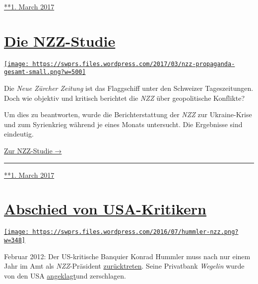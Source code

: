 \href{https://swprs.org/2017/03/01/nzz-new-american-century/}{**1. March
2017}

\hypertarget{die-nzz-studie}{%
\section{\texorpdfstring{\href{https://swprs.org/2017/03/01/die-nzz-studie/}{Die
NZZ-Studie}}{Die NZZ-Studie}}\label{die-nzz-studie}}

\href{https://swprs.org/2017/03/01/die-nzz-studie/}{\texttt{[image: https://swprs.files.wordpress.com/2017/03/nzz-propaganda-gesamt-small.png?w=500]}}

Die \emph{Neue Zürcher Zeitung} ist das Flagg­schiff unter den Schweizer
Tages­zei­tungen. Doch wie objektiv und kritisch berichtet die
\emph{NZZ} über geo­politische Konf‌likte?

Um dies zu be­ant­worten, wurde die Bericht­erstattung der \emph{NZZ}
zur Ukraine-Krise und zum Syrien­krieg während je eines Monats
unter­sucht. Die Ergebnisse sind eindeutig.

\href{https://swprs.org/die-nzz-studie/}{Zur NZZ-Studie →}

\begin{center}\rule{0.5\linewidth}{\linethickness}\end{center}

\href{https://swprs.org/2017/03/01/die-nzz-studie/}{**1. March 2017}

\hypertarget{abschied-von-usa-kritikern}{%
\section{\texorpdfstring{\href{https://swprs.org/2017/03/01/abschied-von-usa-kritikern/}{Abschied
von
USA-Kritikern}}{Abschied von USA-Kritikern}}\label{abschied-von-usa-kritikern}}

\href{https://swprs.org/2017/03/01/abschied-von-usa-kritikern/}{\texttt{[image: https://swprs.files.wordpress.com/2016/07/hummler-nzz.png?w=348]}}

Februar 2012: Der US-kritische Banquier Konrad Hummler muss nach nur
einem Jahr im Amt als \emph{NZZ}-Präsi­dent
\href{https://www.tagesanzeiger.ch/wirtschaft/unternehmen-und-konjunktur/Konrad-Hummler-gibt-NZZVRPraesidium-ab/story/25627682}{zurück­treten}.
Seine Privatbank \emph{Wegelin} wurde von den USA
\href{https://www.tagesanzeiger.ch/wirtschaft/unternehmen-und-konjunktur/USA-erhoehen-mit-WegelinKlage-den-Druck/story/25658973}{an­ge­klagt}und
zerschlagen.

